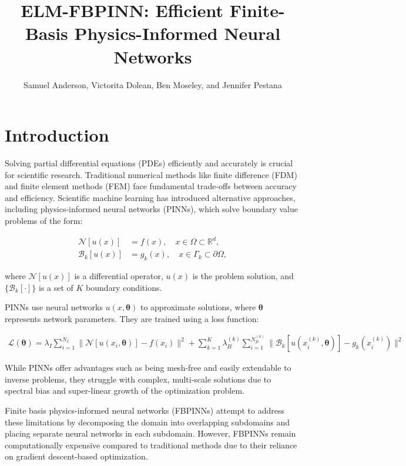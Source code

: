 \documentclass[11pt]{article}
\title{ELM-FBPINN: Efficient Finite-Basis Physics-Informed Neural Networks}
\author{Samuel Anderson, Victorita Dolean, Ben Moseley, and Jennifer Pestana}
\date{}
\begin{document}
\maketitle

\section{Introduction}

Solving partial differential equations (PDEs) efficiently and accurately is crucial for scientific research. Traditional numerical methods like finite difference (FDM) and finite element methods (FEM) face fundamental trade-offs between accuracy and efficiency. Scientific machine learning has introduced alternative approaches, including physics-informed neural networks (PINNs), which solve boundary value problems of the form:

\begin{align}
    \mathcal{N}[u(x)] &= f(x), \quad x \in \Omega \subset \mathbb{R}^d, \\
    \mathcal{B}_k[u(x)] &= g_k(x), \quad x \in \Gamma_k \subset \partial\Omega,
\end{align}

where $\mathcal{N}[u(x)]$ is a differential operator, $u(x)$ is the problem solution, and $\{\mathcal{B}_k[\cdot]\}$ is a set of $K$ boundary conditions.

PINNs use neural networks $u(x,\boldsymbol{\theta})$ to approximate solutions, where $\boldsymbol{\theta}$ represents network parameters. They are trained using a loss function:

\begin{align}
    \mathcal{L}(\boldsymbol{\theta}) = \lambda_I \sum_{i=1}^{N_I} \|\mathcal{N}[u(x_i,\boldsymbol{\theta})]-f(x_i)\|^2 + \sum_{k=1}^{K}\lambda_B^{(k)} \sum_{i=1}^{N_B^{(k)}} \|\mathcal{B}_k[u(x_i^{(k)},\boldsymbol{\theta})]-g_k(x_i^{(k)})\|^2
\end{align}

While PINNs offer advantages such as being mesh-free and easily extendable to inverse problems, they struggle with complex, multi-scale solutions due to spectral bias and super-linear growth of the optimization problem.

Finite basis physics-informed neural networks (FBPINNs) attempt to address these limitations by decomposing the domain into overlapping subdomains and placing separate neural networks in each subdomain. However, FBPINNs remain computationally expensive compared to traditional methods due to their reliance on gradient descent-based optimization.
\end{document}
